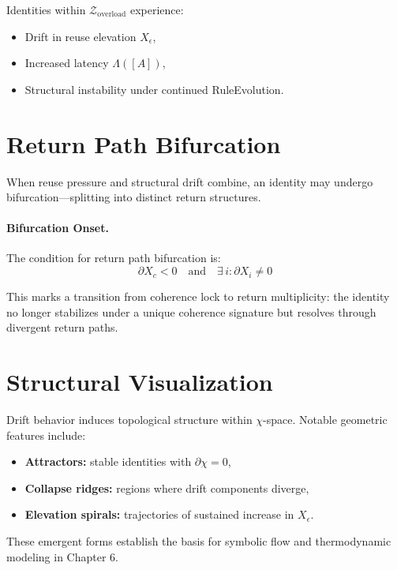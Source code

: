 Identities within $\mathcal{Z}_{\text{overload}}$ experience:
\begin{itemize}
    \item Drift in reuse elevation $X_\epsilon$,
    \item Increased latency $\Lambda([A])$,
    \item Structural instability under continued RuleEvolution.
\end{itemize}

\section{Return Path Bifurcation} \label{return-path-bifurcation}

When reuse pressure and structural drift combine, an identity may undergo bifurcation—splitting into distinct return structures.

\paragraph{Bifurcation Onset.}
The condition for return path bifurcation is:
\begin{equation} \label{eq:bifurcation-condition}
\partial X_c < 0 \quad \text{and} \quad \exists\, i : \partial X_i \ne 0
\end{equation}

This marks a transition from coherence lock to return multiplicity: the identity no longer stabilizes under a unique coherence signature but resolves through divergent return paths.

\section{Structural Visualization} \label{structural-visualization}

Drift behavior induces topological structure within $\chi$-space. Notable geometric features include:

\begin{itemize}
    \item \textbf{Attractors:} stable identities with $\partial\chi = 0$,
    \item \textbf{Collapse ridges:} regions where drift components diverge,
    \item \textbf{Elevation spirals:} trajectories of sustained increase in $X_\epsilon$.
\end{itemize}

These emergent forms establish the basis for symbolic flow and thermodynamic modeling in Chapter 6.

